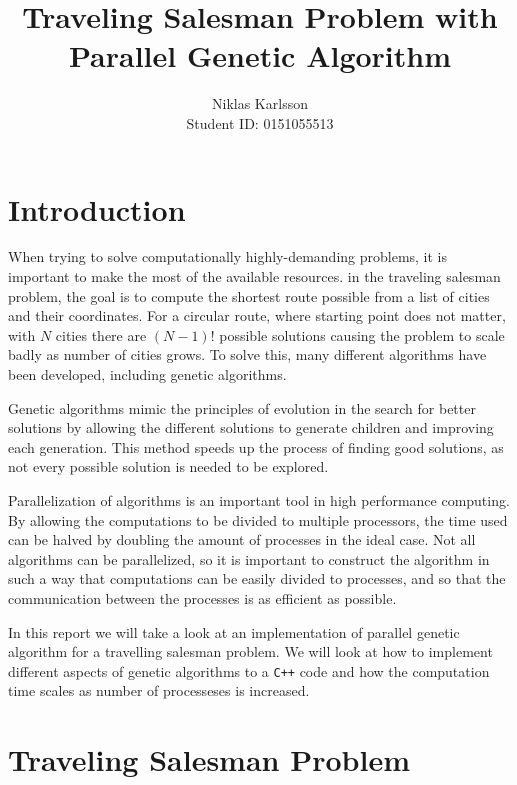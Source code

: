 \documentclass[12pt]{article}
\begin{document}
\title{Traveling Salesman Problem with Parallel Genetic Algorithm}
\author{Niklas Karlsson \\ Student ID: 0151055513}
\date{}
\maketitle

\newpage


\section{Introduction}

When trying to solve computationally highly-demanding problems, it is important to make the most
of the available resources. in the traveling salesman problem, the goal is to compute the shortest
route possible from a list of cities and their coordinates. For a circular route, where starting
point does not matter, with $N$ cities there are $(N-1)!$ possible solutions causing the problem to
scale badly as number of cities grows. To solve this, many different algorithms have been
developed, including genetic algorithms.

Genetic algorithms mimic the principles of evolution in the search for better solutions by
allowing the different solutions to generate children and improving each generation. This method
speeds up the process of finding good solutions, as not every possible solution is needed to be
explored.

Parallelization of algorithms is an important tool in high performance computing. By allowing
the computations to be divided to multiple processors, the time used can be halved by
doubling the amount of processes in the ideal case. Not all algorithms can be parallelized, so it
is important to construct the algorithm in such a way that computations can be easily divided to
processes, and so that the communication between the processes is as efficient as possible.

In this report we will take a look at an implementation of parallel genetic algorithm for a
travelling salesman problem. We will look at how to implement different aspects of genetic
algorithms to a \lstinline!C++! code and how the computation time scales as number of processeses
is increased.


\section{Traveling Salesman Problem}
\end{document}

